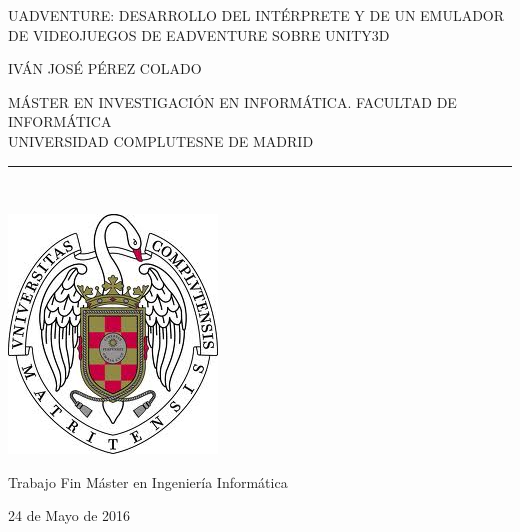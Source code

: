 \begin{center}

   \vspace{1cm}


   {\Large UADVENTURE: DESARROLLO DEL INTÉRPRETE Y DE UN EMULADOR DE VIDEOJUEGOS DE EADVENTURE SOBRE UNITY3D}\\

   \vspace{0.5cm}



   \vspace{0.5cm}



   {\large IVÁN JOSÉ PÉREZ COLADO}\\

   \vspace{0.5cm}




   MÁSTER EN INVESTIGACIÓN EN INFORMÁTICA. FACULTAD DE INFORMÁTICA\\
   UNIVERSIDAD COMPLUTESNE DE MADRID \\


   \vspace{0.65cm}
   \rule{2in}{0.5pt}\\
   \vspace{0.85cm}

  \includegraphics[height=2.5in]{figures/escudo.jpg}
  

   \vspace{0.5cm}
Trabajo Fin Máster en Ingeniería Informática

   \vspace{0.5cm}






  24 de Mayo de 2016\\
   \vspace{1cm}

\end{center}

